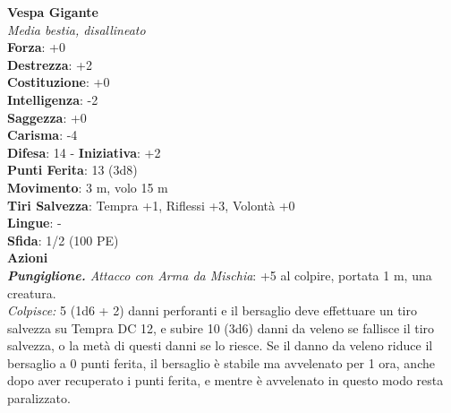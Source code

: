 \begin{multicols}{2}
\medskip\textbf{Vespa Gigante}\\
\emph{Media bestia, disallineato}\\
\textbf{Forza}: +0\\
\textbf{Destrezza}: +2\\
\textbf{Costituzione}: +0\\
\textbf{Intelligenza}: -2\\
\textbf{Saggezza}: +0\\
\textbf{Carisma}: -4\\
\textbf{Difesa}: 14 - \textbf{Iniziativa}: +2\\
\textbf{Punti Ferita}: 13 (3d8)\\
\textbf{Movimento}: 3 m, volo 15 m\\
\textbf{Tiri Salvezza}: Tempra +1, Riflessi +3, Volontà +0 \\
\textbf{Lingue}: -\\
\textbf{Sfida}: 1/2 (100 PE)\smallskip\\
\smallskip\textbf{Azioni}\\
\emph{\textbf{Pungiglione.} Attacco con Arma da Mischia}: +5 al colpire, portata 1 m, una creatura.\\
\emph{Colpisce:} 5 (1d6 + 2) danni perforanti e il bersaglio deve effettuare un tiro salvezza su Tempra DC  12, e subire 10 (3d6) danni da veleno se fallisce il tiro salvezza, o la metà di questi danni se lo riesce. Se il danno da veleno riduce il bersaglio a 0 punti ferita, il bersaglio è stabile ma avvelenato per 1 ora, anche dopo aver recuperato i punti ferita, e mentre è avvelenato in questo modo resta paralizzato.\\


\end{multicols}
